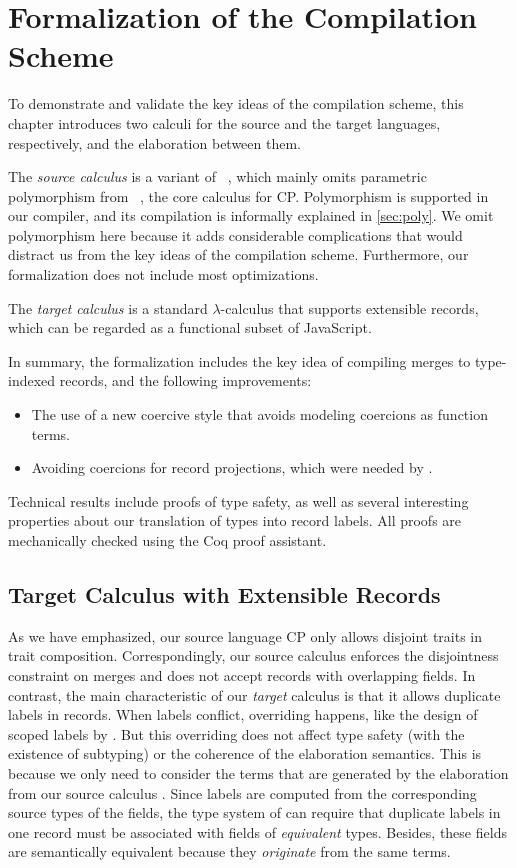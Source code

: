 \chapter{Formalization of the Compilation Scheme} \label{ch:calculi}

To demonstrate and validate the key ideas of the compilation scheme, this
chapter introduces two calculi for the source and the target languages,
respectively, and the elaboration between them.

The \emph{source calculus} is a variant of
\lambdaiplus~\citep{bi2018essence,huang2021taming}, which mainly omits
parametric polymorphism from \fiplus~\citep{bi2019distributive,fan2022direct},
the core calculus for CP. Polymorphism is supported in our compiler, and its
compilation is informally explained in \autoref{sec:poly}. We omit polymorphism
here because it adds considerable complications that would distract us from the
key ideas of the compilation scheme. Furthermore, our formalization does not
include most optimizations.

The \emph{target calculus} \lambdar is a standard $\lambda$-calculus that
supports extensible records, which can be regarded as a functional subset of
JavaScript.

In summary, the formalization includes the key idea of compiling merges to
type-indexed records, and the following improvements:
\begin{itemize}
\item The use of a new coercive style that avoids modeling coercions as function
      terms.
\item Avoiding coercions for record projections, which were needed by
      \citet{fan2022direct}.
\end{itemize}
Technical results include proofs of type safety, as well as several interesting
properties about our translation of types into record labels. All proofs are
mechanically checked using the Coq proof assistant.

\section{Target Calculus with Extensible Records}

As we have emphasized, our source language CP only allows disjoint traits in
trait composition. Correspondingly, our source calculus \lambdaiplus enforces
the disjointness constraint on merges and does not accept records with
overlapping fields. In contrast, the main characteristic of our \emph{target}
calculus \lambdar is that it allows duplicate labels in records. When labels
conflict, overriding happens, like the design of scoped labels by
\citet{leijen2005extensible}. But this overriding does not affect type safety
(with the existence of subtyping) or the coherence of the elaboration semantics.
This is because we only need to consider the terms that are generated by the
elaboration from our source calculus \lambdaiplus. Since labels are computed
from the corresponding source types of the fields, the type system of \lambdar
can require that duplicate labels in one record must be associated with fields
of \emph{equivalent} types. Besides, these fields are semantically equivalent
because they \emph{originate} from the same terms.


